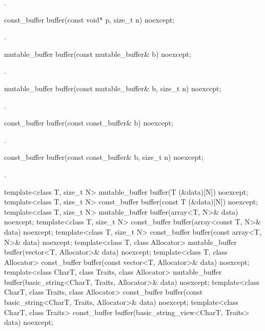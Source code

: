 \begin{itemdescr}
\pnum
\returns {}.
\end{itemdescr}

\begin{itemdecl}
const_buffer buffer(const void* p, size_t n) noexcept;
\end{itemdecl}

\begin{itemdescr}
\pnum
\returns {}.
\end{itemdescr}

\begin{itemdecl}
mutable_buffer buffer(const mutable_buffer& b) noexcept;
\end{itemdecl}

\begin{itemdescr}
\pnum
\returns {}.
\end{itemdescr}

\begin{itemdecl}
mutable_buffer buffer(const mutable_buffer& b, size_t n) noexcept;
\end{itemdecl}

\begin{itemdescr}
\pnum
\returns {}.
\end{itemdescr}

\begin{itemdecl}
const_buffer buffer(const const_buffer& b) noexcept;
\end{itemdecl}

\begin{itemdescr}
\pnum
\returns {}.
\end{itemdescr}

\begin{itemdecl}
const_buffer buffer(const const_buffer& b, size_t n) noexcept;
\end{itemdecl}

\begin{itemdescr}
\pnum
\returns {}.
\end{itemdescr}

\begin{itemdecl}
template<class T, size_t N>
  mutable_buffer buffer(T (&data)[N]) noexcept;
template<class T, size_t N>
  const_buffer buffer(const T (&data)[N]) noexcept;
template<class T, size_t N>
  mutable_buffer buffer(array<T, N>& data) noexcept;
template<class T, size_t N>
  const_buffer buffer(array<const T, N>& data) noexcept;
template<class T, size_t N>
  const_buffer buffer(const array<T, N>& data) noexcept;
template<class T, class Allocator>
  mutable_buffer buffer(vector<T, Allocator>& data) noexcept;
template<class T, class Allocator>
  const_buffer buffer(const vector<T, Allocator>& data) noexcept;
template<class CharT, class Traits, class Allocator>
  mutable_buffer buffer(basic_string<CharT, Traits, Allocator>& data) noexcept;
template<class CharT, class Traits, class Allocator>
  const_buffer buffer(const basic_string<CharT, Traits, Allocator>& data) noexcept;
template<class CharT, class Traits>
  const_buffer buffer(basic_string_view<CharT, Traits> data) noexcept;
\end{itemdecl}

